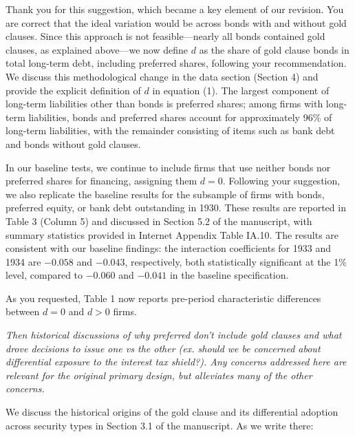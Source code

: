 \begin{itemize}
    \noindent Thank you for this suggestion, which became a key element of our revision. You are correct that the ideal variation would be across bonds with and without gold clauses. Since this approach is not feasible—nearly all bonds contained gold clauses, as explained above—we now define $d$ as the share of gold clause bonds in total long-term debt, including preferred shares, following your recommendation. We discuss this methodological change in the data section (Section 4) and provide the explicit definition of $d$ in equation (1). The largest component of long-term liabilities other than bonds is preferred shares; among firms with long-term liabilities, bonds and preferred shares account for approximately 96\% of long-term liabilities, with the remainder consisting of items such as bank debt and bonds without gold clauses.

    In our baseline tests, we continue to include firms that use neither bonds nor preferred shares for financing, assigning them $d = 0$. Following your suggestion, we also replicate the baseline results for the subsample of firms with bonds, preferred equity, or bank debt outstanding in 1930. These results are reported in Table 3 (Column 5) and discussed in Section 5.2 of the manuscript, with summary statistics provided in Internet Appendix Table IA.10. The results are consistent with our baseline findings: the interaction coefficients for 1933 and 1934 are $-0.058$ and $-0.043$, respectively, both statistically significant at the 1\% level, compared to $-0.060$ and $-0.041$ in the baseline specification.

    As you requested, Table 1 now reports pre-period characteristic differences between $d = 0$ and $d > 0$ firms.

    \textit{\textcolor{red!60!black}{
    Then historical discussions of why preferred don't include gold clauses and what drove decisions to issue one vs the other (ex. should we be concerned about differential exposure to the interest tax shield?). Any concerns addressed here are relevant for the original primary design, but alleviates many of the other concerns. 
    }}

    \bigskip
    
    We discuss the historical origins of the gold clause and its differential adoption across security types in Section 3.1 of the manuscript. As we write there:
    

\end{itemize}
